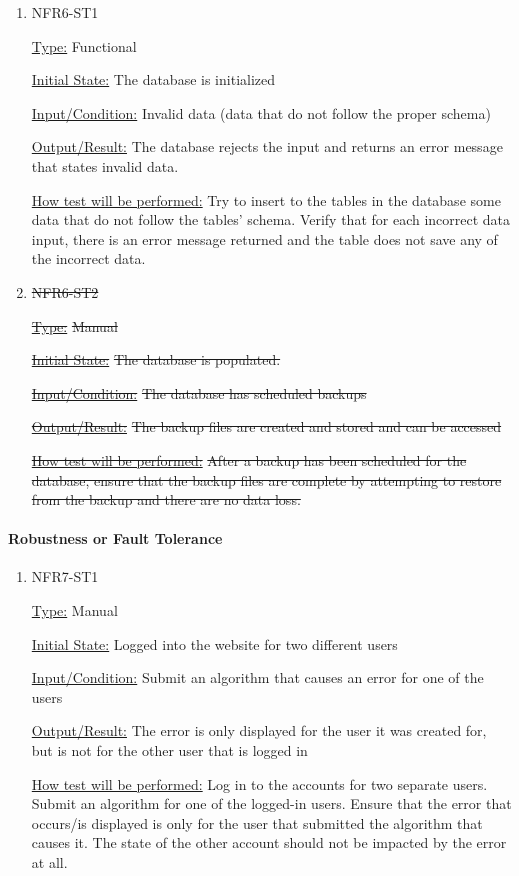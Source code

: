 \documentclass[12pt, titlepage]{article}
\begin{document}
\begin{enumerate}

\item{NFR6-ST1\\}

\underline{Type:} Functional 

\underline{Initial State:} The database is initialized

\underline{Input/Condition:} Invalid data (data that do not follow the proper schema)  

\underline{Output/Result:} The database rejects the input and returns an error message that states invalid data.


\underline{How test will be performed:} 
Try to insert to the tables in the database some data that do not follow the tables’ schema. Verify that for each incorrect data input, there is an error message returned and the table does not save any of the incorrect data.

\item{\sout{NFR6-ST2\\}}

\underline{\sout{Type:}} \sout{Manual }

\underline{\sout{Initial State:}} \sout{The database is populated.}

\underline{\sout{Input/Condition:}} \sout{The database has scheduled backups }

\underline{\sout{Output/Result:}} \sout{The backup files are created and stored and can be accessed}


\underline{\sout{How test will be performed:}} \sout{After a backup has been scheduled for the database, ensure that the backup files are complete by attempting to restore from the backup and there are no data loss.}


\end{enumerate}

\paragraph{Robustness or Fault Tolerance}

\begin{enumerate}

\item{NFR7-ST1\\}

\underline{Type:} Manual

\underline{Initial State:} Logged into the website for two different users

\underline{Input/Condition:} Submit an algorithm that causes an error for one of the users

\underline{Output/Result:} The error is only displayed for the user it was created for, but is not for the other user that is logged in

\underline{How test will be performed:} 
Log in to the accounts for two separate users. Submit an algorithm for one of the logged-in users. Ensure that the error that occurs/is displayed is only for the user that submitted the algorithm that causes it. The state of the other account should not be impacted by the error at all.

\end{enumerate}
\end{document}
